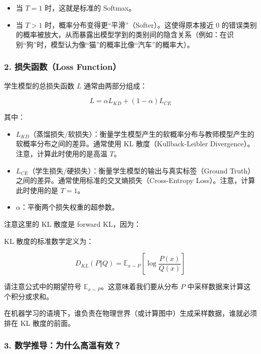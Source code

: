 \begin{itemize}
\tightlist
\item
  当 \(T = 1\) 时，这就是标准的 Softmax。
\item
  当 \(T > 1\) 时，概率分布变得更``平滑''（Softer）。这使得原本接近 0 的错误类别的概率被放大，从而暴露出模型学到的类别间的隐含关系（例如：在识别``狗''时，模型认为像``猫''的概率比像``汽车''的概率大）。
\end{itemize}

\hypertarget{ux635fux5931ux51fdux6570loss-function}{%
\subsubsection{2. 损失函数（Loss Function）}\label{ux635fux5931ux51fdux6570loss-function}}

学生模型的总损失函数 \(L\) 通常由两部分组成：

\[
L = \alpha L_{KD} + (1 - \alpha)L_{CE}
\]

其中：

\begin{itemize}
\tightlist
\item
  \(L_{KD}\)（蒸馏损失/软损失）：衡量学生模型产生的软概率分布与教师模型产生的软概率分布之间的差异。通常使用 KL 散度（Kullback-Leibler Divergence）。注意，计算此时使用的是高温 \(T\)。
\item
  \(L_{CE}\)（学生损失/硬损失）：衡量学生模型的输出与真实标签（Ground Truth）之间的差异。通常使用标准的交叉熵损失（Cross-Entropy Loss）。注意，计算此时使用的是 \(T = 1\)。
\item
  \(\alpha\)：平衡两个损失权重的超参数。
\end{itemize}

注意这里的 KL 散度是 forward KL，因为：

KL 散度的标准数学定义为：

\[
D_{KL}(P \Vert Q) = \mathbb{E}_{x \sim P}\left[\log \frac{P(x)}{Q(x)}\right]
\]

请注意公式中的期望符号 \(\mathbb{E}_{x \sim P}\)。这意味着我们要从分布 \(P\) 中采样数据来计算这个积分或求和。

在机器学习的语境下，谁负责在物理世界（或计算图中）生成采样数据，谁就必须排在 KL 散度的前面。

\hypertarget{ux6570ux5b66ux63a8ux5bfcux4e3aux4ec0ux4e48ux9ad8ux6e29ux6709ux6548}{%
\subsubsection{3. 数学推导：为什么高温有效？}\label{ux6570ux5b66ux63a8ux5bfcux4e3aux4ec0ux4e48ux9ad8ux6e29ux6709ux6548}}

